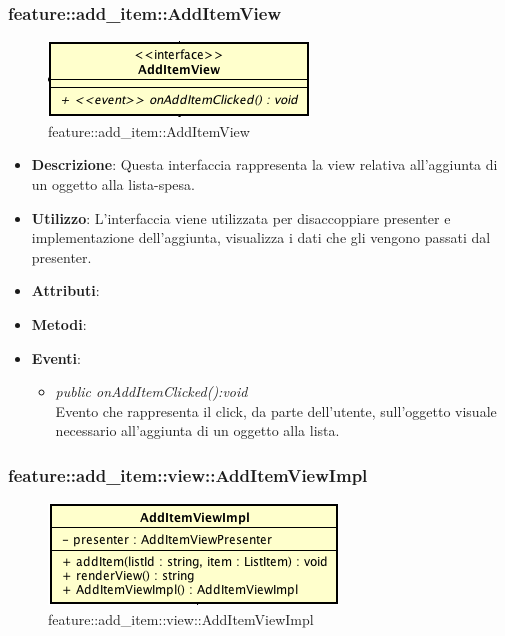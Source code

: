 \subsubsection{feature::add\_item::AddItemView}

\label{feature::add_item::AddItemView}
\begin{figure}[H]
	\centering
	\includegraphics[scale=0.5]{Sezioni/SottosezioniST/img/app/AddItemView.png}
	\caption{feature::add\_item::AddItemView}
\end{figure}

\begin{itemize}
\item \textbf{Descrizione}: Questa interfaccia rappresenta la view relativa all'aggiunta di un oggetto alla lista-spesa.
\item \textbf{Utilizzo}: L'interfaccia viene utilizzata per disaccoppiare presenter e implementazione dell'aggiunta, visualizza i dati che gli vengono passati dal presenter.
\item \textbf{Attributi}: 
\item \textbf{Metodi}:
\item \textbf{Eventi}:
	\begin{itemize}	
	\item \textit{public onAddItemClicked():void}\\
	Evento che rappresenta il click, da parte dell'utente, sull'oggetto visuale necessario all'aggiunta di un oggetto alla lista.
	\end{itemize}
\end{itemize}

\subsubsection{feature::add\_item::view::AddItemViewImpl}

\label{feature::add_item::view::AddItemViewImpl}
\begin{figure}[H]
	\centering
	\includegraphics[scale=0.5]{Sezioni/SottosezioniST/img/app/AddItemViewImplementation.png}
	\caption{feature::add\_item::view::AddItemViewImpl}
\end{figure}

